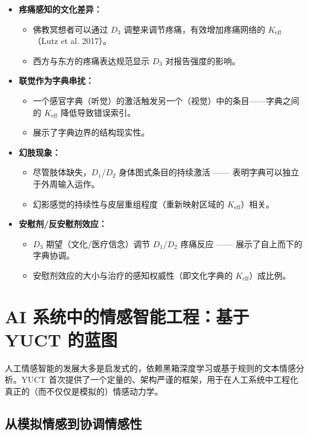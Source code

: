 \documentclass[12pt,a4paper]{article}
\newcommand{\eff}{\mathrm{eff}}
\newcommand{\Ke}{K_{\eff}}
\begin{document}
	\begin{itemize}
		\item \textbf{疼痛感知的文化差异：}
		\begin{itemize}
			\item 佛教冥想者可以通过 $D_3$ 调整来调节疼痛，有效增加疼痛网络的 $\Ke$（Lutz et al. 2017）。
			\item 西方与东方的疼痛表达规范显示 $D_3$ 对报告强度的影响。
		\end{itemize}
		
		\item \textbf{联觉作为字典串扰：}
		\begin{itemize}
			\item 一个感官字典（听觉）的激活触发另一个（视觉）中的条目——字典之间的 $\Ke$ 降低导致错误索引。
			\item 展示了字典边界的结构现实性。
		\end{itemize}
		
		\item \textbf{幻肢现象：}
		\begin{itemize}
			\item 尽管肢体缺失，$D_1$/$D_2$ 身体图式条目的持续激活 —— 表明字典可以独立于外周输入运作。
			\item 幻影感觉的持续性与皮层重组程度（重新映射区域的 $\Ke$）相关。
		\end{itemize}
		
		\item \textbf{安慰剂/反安慰剂效应：}
		\begin{itemize}
			\item $D_3$ 期望（文化/医疗信念）调节 $D_1$/$D_2$ 疼痛反应 —— 展示了自上而下的字典协调。
			\item 安慰剂效应的大小与治疗的感知权威性（即文化字典的 $\Ke$）成比例。
		\end{itemize}
	\end{itemize}
	
	\section{AI 系统中的情感智能工程：基于 YUCT 的蓝图}
	
	人工情感智能的发展大多是启发式的，依赖黑箱深度学习或基于规则的文本情感分析。YUCT 首次提供了一个定量的、架构严谨的框架，用于在人工系统中工程化真正的（而不仅仅是模拟的）情感动力学。
	
	\subsection{从模拟情感到协调情感性}
	
\end{document}
